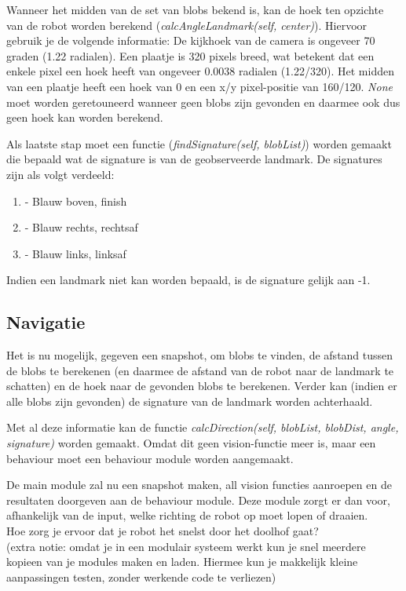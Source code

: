 \documentclass[a4paper]{article}
\begin{document}
Wanneer het midden van de set van blobs bekend is, kan de hoek ten opzichte van de robot worden berekend (\textit{calcAngleLandmark(self, center)}). Hiervoor gebruik je de volgende informatie:
De kijkhoek van de camera is ongeveer 70 graden (1.22 radialen). Een plaatje is 320 pixels breed, wat betekent dat een enkele pixel een hoek heeft van ongeveer 0.0038 radialen (1.22/320). Het midden van een plaatje heeft een hoek van 0 en een x/y pixel-positie van 160/120. \textit{None} moet worden geretouneerd wanneer geen blobs zijn gevonden en daarmee ook dus geen hoek kan worden berekend.

Als laatste stap moet een functie (\textit{findSignature(self, blobList)}) worden gemaakt die bepaald wat de signature is van de geobserveerde landmark. De signatures zijn als volgt verdeeld:

\begin{enumerate}
\item - Blauw boven, finish
\item - Blauw rechts, rechtsaf
\item - Blauw links, linksaf
\end{enumerate}

Indien een landmark niet kan worden bepaald, is de signature gelijk aan -1.

\subsection{Navigatie}

Het is nu mogelijk, gegeven een snapshot, om blobs te vinden, de afstand tussen de blobs te berekenen (en daarmee de afstand van de robot naar de landmark te schatten) en de hoek naar de gevonden blobs te berekenen. Verder kan (indien er alle blobs zijn gevonden) de signature van de landmark worden achterhaald.

Met al deze informatie kan de functie \textit{calcDirection(self, blobList, blobDist, angle, signature)} worden gemaakt. Omdat dit geen vision-functie meer is, maar een behaviour moet een behaviour module worden aangemaakt.

De main module zal nu een snapshot maken, all vision functies aanroepen en de resultaten doorgeven aan de behaviour module. Deze module zorgt er dan voor, afhankelijk van de input, welke richting de robot op moet lopen of draaien.
\\

Hoe zorg je ervoor dat je robot het snelst door het doolhof gaat?\\

(extra notie: omdat je in een modulair systeem werkt kun je snel meerdere kopieen van je modules maken en laden. Hiermee kun je makkelijk kleine aanpassingen testen, zonder werkende code te verliezen)
\end{document}
